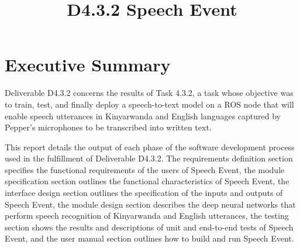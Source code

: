 \documentclass{CSSRforAfrica}
\begin{document}



\title{D4.3.2 Speech Event}    %





\maketitle

\section*{Executive Summary}
\label{executive_summary}

Deliverable D4.3.2 concerns the results of Task 4.3.2, a task whose objective was to train, test, and finally deploy a speech-to-text model on a ROS node that will enable speech utterances in Kinyarwanda and English languages captured by Pepper's microphones to be transcribed into written text.

This report details the output of each phase of the software development process used in the fulfillment of Deliverable D4.3.2. The requirements definition section specifies the functional requirements of the users of Speech Event, the module specification section outlines the functional characteristics of Speech Event, the interface design section outlines the specification of the inputs and outputs of Speech Event, the module design section describes the deep neural networks that perform speech recognition of Kinyarwanda and English utterances, the testing section shows the results and descriptions of unit and end-to-end tests of Speech Event, and the user manual section outlines how to build and run Speech Event.
\end{document}

